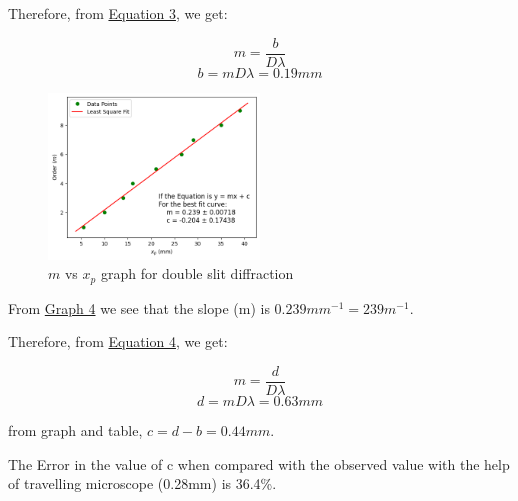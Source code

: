         Therefore, from \hyperref[eqn:3]{Equation 3}, we get:

        $$m = \frac{b}{D\lambda}$$
        $$b = mD\lambda = 0.19mm$$


        

        \begin{figure}[H]
            \centering
            \includegraphics[width=0.5\textwidth]{images/graph_4.png}
            \caption{$m$ vs $x_p$ graph for double slit diffraction}
            \label{graph:4}
        \end{figure}

        From \hyperref[graph:4]{Graph 4} we see that the slope (m) is $0.239 mm^{-1} = 239 m^{-1}$.

        Therefore, from \hyperref[eqn:4]{Equation 4}, we get:

        $$m = \frac{d}{D\lambda}$$
        $$d = mD\lambda = 0.63mm$$

        from graph and table, $c = d-b = 0.44mm$.

        \vspace{2mm}
        The Error in the value of c when compared with the observed value with the help of travelling microscope (0.28mm) is 36.4\%.